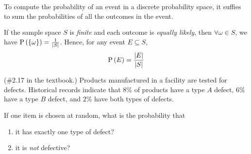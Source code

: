 \documentclass[11pt]{article}
\begin{document}
\begin{rem}
    To compute the probability of an event in a discrete probability space, it
    suffies to sum the probabilities of all the outcomes in the event.
\end{rem}

\begin{rem}
    If the sample space $S$ is \emph{finite} and each outcome is
    \emph{equally likely}, then $\forall \omega \in S$, we have
    $\P{\{\omega\}} = \frac{1}{|S|}$. Hence, for any event $E \subseteq S$,
    \begin{equation*}
        \P{E} = \frac{|E|}{|S|}
    \end{equation*}
\end{rem}

\begin{eg}{(\#2.17 in the textbook.)}
    Products manufactured in a facility are tested for defects. Historical
    records indicate that $8\%$ of products have a type $A$ defect, $6\%$ have
    a type $B$ defect, and $2\%$ have both types of defects.

    If one item is chosen at random, what is the probability that
    \begin{enumerate}
        \item it has exactly one type of defect?
        \item it is \emph{not} defective?
    \end{enumerate}
\end{eg}
\end{document}
